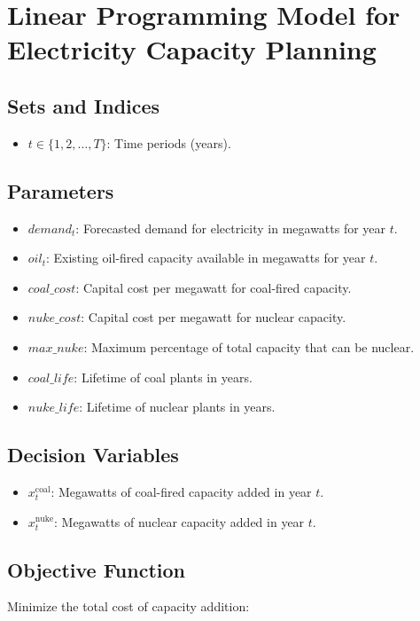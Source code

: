 \documentclass{article}
\begin{document}
\section*{Linear Programming Model for Electricity Capacity Planning}

\subsection*{Sets and Indices}
\begin{itemize}
    \item $t \in \{1, 2, \ldots, T\}$: Time periods (years).
\end{itemize}

\subsection*{Parameters}
\begin{itemize}
    \item $demand_t$: Forecasted demand for electricity in megawatts for year $t$.
    \item $oil_t$: Existing oil-fired capacity available in megawatts for year $t$.
    \item $coal\_cost$: Capital cost per megawatt for coal-fired capacity.
    \item $nuke\_cost$: Capital cost per megawatt for nuclear capacity.
    \item $max\_nuke$: Maximum percentage of total capacity that can be nuclear.
    \item $coal\_life$: Lifetime of coal plants in years.
    \item $nuke\_life$: Lifetime of nuclear plants in years.
\end{itemize}

\subsection*{Decision Variables}
\begin{itemize}
    \item $x_t^{\text{coal}}$: Megawatts of coal-fired capacity added in year $t$.
    \item $x_t^{\text{nuke}}$: Megawatts of nuclear capacity added in year $t$.
\end{itemize}

\subsection*{Objective Function}
Minimize the total cost of capacity addition:
\end{document}
